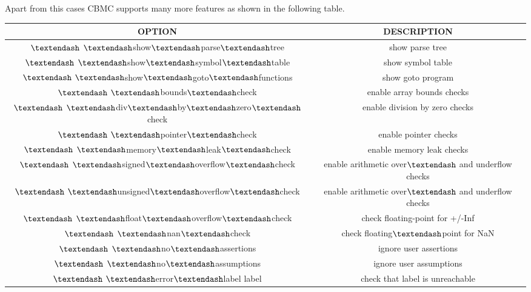  
Apart from this cases CBMC supports many more features as shown in the following table.
 
\begin{center}

\begin{tabular}{|| c | c ||}

\hline

OPTION & DESCRIPTION  \\ [0.5ex]

\hline
\hline
$\textendash$ $\textendash$show$\textendash$parse$\textendash$tree     &       show parse tree \\
\hline
$\textendash$ $\textendash$show$\textendash$symbol$\textendash$table    &      show symbol table \\
\hline
$\textendash$ $\textendash$show$\textendash$goto$\textendash$functions   &     show goto program \\
\hline
$\textendash$ $\textendash$bounds$\textendash$check    &           enable array bounds checks \\
\hline
$\textendash$ $\textendash$div$\textendash$by$\textendash$zero$\textendash$check     &     enable division by zero checks \\
\hline
$\textendash$ $\textendash$pointer$\textendash$check         &     enable pointer checks \\  
\hline
$\textendash$ $\textendash$memory$\textendash$leak$\textendash$check      &    enable memory leak checks \\
\hline\hline
$\textendash$ $\textendash$signed$\textendash$overflow$\textendash$check   &   enable arithmetic over$\textendash$ and underflow checks \\
\hline
$\textendash$ $\textendash$unsigned$\textendash$overflow$\textendash$check  &  enable arithmetic over$\textendash$ and underflow checks \\
\hline
$\textendash$ $\textendash$float$\textendash$overflow$\textendash$check      & check floating-point for +/-Inf \\
\hline
$\textendash$ $\textendash$nan$\textendash$check               &   check floating$\textendash$point for NaN \\
\hline
$\textendash$ $\textendash$no$\textendash$assertions           &   ignore user assertions \\
\hline
$\textendash$ $\textendash$no$\textendash$assumptions          &   ignore user assumptions \\
\hline
$\textendash$ $\textendash$error$\textendash$label label       &   check that label is unreachable \\

\end{tabular}
\end{center}
